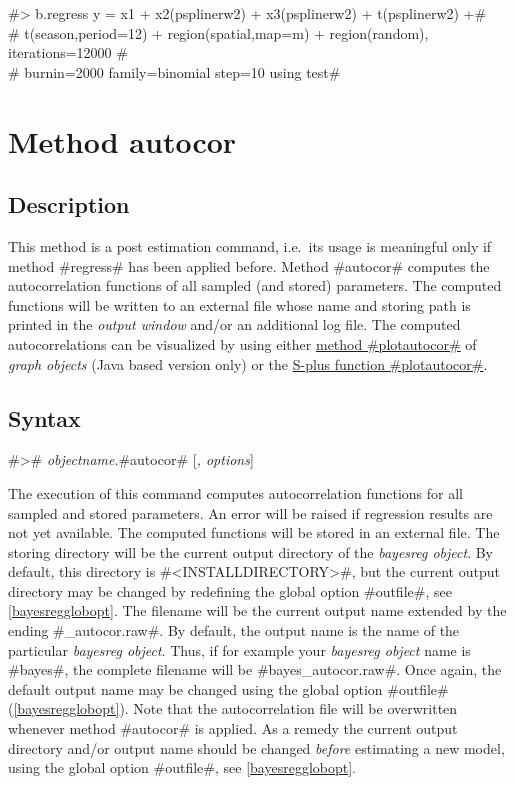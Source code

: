 #> b.regress y = x1 + x2(psplinerw2) + x3(psplinerw2) + t(psplinerw2) +# \\
#  t(season,period=12) + region(spatial,map=m) + region(random), iterations=12000 #\\
#  burnin=2000 family=binomial step=10 using test#



\section{Method autocor}
\label{bayesautocorr} 
 


\subsection{Description}

This method is a post estimation command, i.e.~its usage is
meaningful only if method #regress# has been applied before.
Method #autocor# computes the autocorrelation functions of all
sampled (and stored) parameters. The computed functions will be
written to an external file whose name and storing path is printed
in the {\em output window} and/or an additional log file. The
computed autocorrelations can be visualized by using either
\hyperref[graphplotautocor]{method #plotautocor#} of {\em graph
objects} (Java based version only) or the
\hyperref[splusplotautocor]{S-plus function #plotautocor#}.

\subsection{Syntax}

#># {\em objectname}.#autocor# [{\em , options}]

The execution of this command computes autocorrelation functions
for all sampled and stored parameters. An error
 will be raised
if regression results are not yet available. The computed
functions will be stored in an external file. The storing
directory will be the current output directory of the {\em
bayesreg object}. By default, this directory is
#<INSTALLDIRECTORY>\output#, but the current output
directory may be changed by redefining the global option
#outfile#, see \autoref{bayesregglobopt}. The filename will be
the current output name extended by the ending #_autocor.raw#. By
default, the output name is the name of the particular {\em
bayesreg object}. Thus, if for example your {\em bayesreg object}
 name is #bayes#, the complete
filename will be #bayes_autocor.raw#. Once again, the  default
output name may be changed using the global option #outfile#
(\autoref{bayesregglobopt}). Note that the autocorrelation file
will be overwritten whenever method #autocor# is applied. As a
remedy the current output directory and/or output name should be
changed {\em before} estimating a new model, using the global
option #outfile#, see \autoref{bayesregglobopt}.


